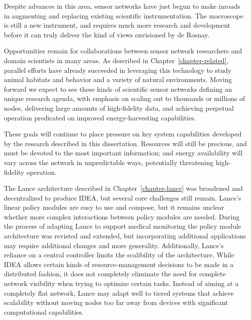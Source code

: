 Despite advances in this area, sensor networks have just begun to make
inroads in augmenting and replacing existing scientific instrumentation. The
macroscope is still a new instrument, and requires much more research and
development before it can truly deliver the kind of views envisioned by de
Rosnay.

Opportunities remain for collaborations between sensor network researchers
and domain scientists in many areas. As described in
Chapter~\ref{chapter-related}, parallel efforts have already succeeded in
leveraging this technology to study animal habitats and behavior and a
variety of natural environments. Moving forward we expect to see these kinds
of scientific sensor networks defining an unique research agenda, with
emphasis on scaling out to thousands or millions of nodes, delivering large
amounts of high-fidelity data, and achieving perpetual operation predicated
on improved energy-harvesting capabilities.

These goals will continue to place pressure on key system capabilities
developed by the research described in this dissertation. Resources will
still be precious, and must be devoted to the most important information; and
energy availability will vary across the network in unpredictable ways,
potentially threatening high-fidelity operation.

The Lance architecture described in Chapter~\ref{chapter-lance} was broadened
and decentralized to produce IDEA, but several core challenges still remain.
Lance's linear policy modules are easy to use and compose, but it remains
unclear whether more complex interactions between policy modules are needed.
During the process of adapting Lance to support medical monitoring the policy
module architecture was revisted and extended, but incorporating additional
applications may require additional changes and more generality.
Additionally, Lance's reliance on a central controller limits the scalibility
of the architecture. While IDEA allows certain kinds of resource-management
decisions to be made in a distributed fashion, it does not completely
eliminate the need for complete network visibility when trying to optimize
certain tasks. Instead of aiming at a completely flat network, Lance may
adapt well to tiered systems that achieve scalability without moving nodes
too far away from devices with significant computational capabilities.

